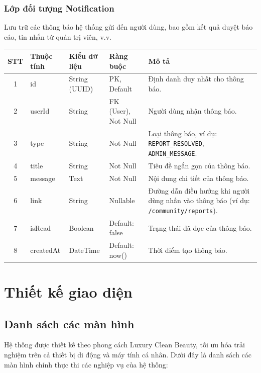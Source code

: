 \documentclass[12pt,a4paper]{article}
\begin{document}
\subsubsection{Lớp đối tượng Notification}
Lưu trữ các thông báo hệ thống gửi đến người dùng, bao gồm kết quả duyệt báo cáo, tin nhắn từ quản trị viên, v.v.

\begin{center}
\renewcommand{\arraystretch}{1.4}
\begin{tabularx}{\textwidth}{|c|l|l|l|X|}
\hline
\rowcolor{blue!15}
\textbf{STT} & \textbf{Thuộc tính} & \textbf{Kiểu dữ liệu} & \textbf{Ràng buộc} & \textbf{Mô tả} \\ \hline
1 & id & String (UUID) & PK, Default & Định danh duy nhất cho thông báo. \\ \hline
2 & userId & String & FK (User), Not Null & Người dùng nhận thông báo. \\ \hline
3 & type & String & Not Null & Loại thông báo, ví dụ: \texttt{REPORT\_RESOLVED}, \texttt{ADMIN\_MESSAGE}. \\ \hline
4 & title & String & Not Null & Tiêu đề ngắn gọn của thông báo. \\ \hline
5 & message & Text & Not Null & Nội dung chi tiết của thông báo. \\ \hline
6 & link & String & Nullable & Đường dẫn điều hướng khi người dùng nhấn vào thông báo (ví dụ: \texttt{/community/reports}). \\ \hline
7 & isRead & Boolean & Default: false & Trạng thái đã đọc của thông báo. \\ \hline
8 & createdAt & DateTime & Default: now() & Thời điểm tạo thông báo. \\ \hline
\end{tabularx}
\end{center}


\section{Thiết kế giao diện}

\subsection{Danh sách các màn hình}
Hệ thống được thiết kế theo phong cách Luxury Clean Beauty, tối ưu hóa trải nghiệm trên cả thiết bị di động và máy tính cá nhân. Dưới đây là danh sách các màn hình chính thực thi các nghiệp vụ của hệ thống:
\end{document}
